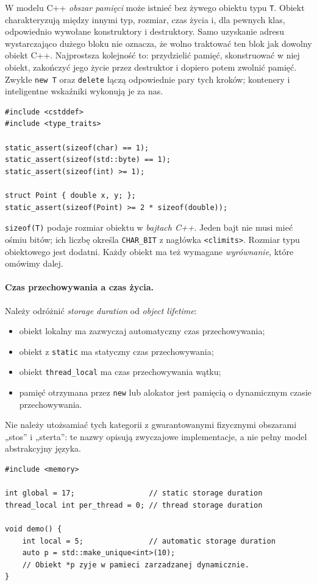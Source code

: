 W modelu C++ \emph{obszar pamięci} może istnieć bez żywego obiektu typu
\texttt{T}. Obiekt charakteryzują między innymi typ, rozmiar, czas życia
i, dla pewnych klas, odpowiednio wywołane konstruktory i destruktory.
Samo uzyskanie adresu wystarczająco dużego bloku nie oznacza, że
wolno traktować ten blok jak dowolny obiekt C++.
Najprostsza kolejność to: przydzielić pamięć, skonstruować w niej
obiekt, zakończyć jego życie przez destruktor i dopiero potem zwolnić
pamięć. Zwykłe \texttt{new T} oraz \texttt{delete} łączą odpowiednie
pary tych kroków; kontenery i inteligentne wskaźniki wykonują je za nas.

\begin{lstlisting}
#include <cstddef>
#include <type_traits>

static_assert(sizeof(char) == 1);
static_assert(sizeof(std::byte) == 1);
static_assert(sizeof(int) >= 1);

struct Point { double x, y; };
static_assert(sizeof(Point) >= 2 * sizeof(double));
\end{lstlisting}

\texttt{sizeof(T)} podaje rozmiar obiektu w \emph{bajtach C++}.
Jeden bajt nie musi mieć ośmiu bitów; ich liczbę określa
\texttt{CHAR\_BIT} z nagłówka \texttt{<climits>}.
Rozmiar typu obiektowego jest dodatni. Każdy obiekt ma też
wymagane \emph{wyrównanie}, które omówimy dalej.

\paragraph{Czas przechowywania a czas życia.}
Należy odróżnić \emph{storage duration} od \emph{object lifetime}:
\begin{itemize}
\item obiekt lokalny ma zazwyczaj automatyczny czas przechowywania;
\item obiekt z \texttt{static} ma statyczny czas przechowywania;
\item obiekt \texttt{thread\_local} ma czas przechowywania wątku;
\item pamięć otrzymana przez \texttt{new} lub alokator jest pamięcią
      o dynamicznym czasie przechowywania.
\end{itemize}
Nie należy utożsamiać tych kategorii z gwarantowanymi fizycznymi
obszarami „stos” i „sterta”: te nazwy opisują zwyczajowe implementacje,
a nie pełny model abstrakcyjny języka.

\begin{lstlisting}
#include <memory>

int global = 17;                 // static storage duration
thread_local int per_thread = 0; // thread storage duration

void demo() {
    int local = 5;               // automatic storage duration
    auto p = std::make_unique<int>(10);
    // Obiekt *p zyje w pamieci zarzadzanej dynamicznie.
}
\end{lstlisting}

